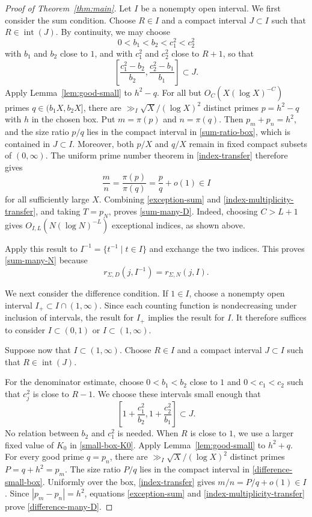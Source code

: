\documentclass[12pt,reqno]{amsart}
\numberwithin{equation}{section}
\theoremstyle{plain}
\theoremstyle{remark}
\begin{document}
\begin{proof}[Proof of Theorem~\ref{thm:main}]
Let $I$ be a nonempty open interval.
We first consider the sum condition.
Choose $R\in I$ and a compact interval $J\subset I$ such that
$R\in\operatorname{int}(J)$.
By continuity, we may choose
\begin{equation*}\label{sum-box-constants}
 0<b_1<b_2<c_1^2<c_2^2
\end{equation*}
with $b_1$ and $b_2$ close to $1$, and with $c_1^2$ and $c_2^2$
close to $R+1$, so that
\begin{equation}\label{sum-ratio-box}
 \left[
  \frac{c_1^2-b_2}{b_2},
  \frac{c_2^2-b_1}{b_1}
 \right]\subset J.
\end{equation}
Apply Lemma~\ref{lem:good-small} to $h^2-q$.
For all but $O_C(X(\log X)^{-C})$ primes $q\in(b_1X,b_2X]$,
there are $\gg_I\sqrt X/(\log X)^2$ distinct primes $p=h^2-q$
with $h$ in the chosen box.
Put $m=\pi(p)$ and $n=\pi(q)$.
Then $p_m+p_n=h^2$, and the size ratio $p/q$ lies in the compact
interval in \eqref{sum-ratio-box}, which is contained in
$J\subset I$.
Moreover, both $p/X$ and $q/X$ remain in fixed compact subsets of
$(0,\infty)$.
The uniform prime number theorem in \eqref{index-transfer} therefore
gives
\[
 \frac mn=\frac{\pi(p)}{\pi(q)}=\frac pq+o(1)\in I
\]
for all sufficiently large $X$.
Combining \eqref{exception-sum} and
\eqref{index-multiplicity-transfer}, and taking $T=p_N$, proves
\eqref{sum-many-D}.
Indeed, choosing $C>L+1$ gives
$O_{I,L}(N(\log N)^{-L})$ exceptional indices, as shown above.

Apply this result to $I^{-1}=\{t^{-1}\mid t\in I\}$ and exchange the
two indices.
This proves \eqref{sum-many-N} because
\[
 r_{\Sigma,D}(j,I^{-1})=r_{\Sigma,N}(j,I).
\]

We next consider the difference condition.
If $1\in I$, choose a nonempty open interval
$I_+\subset I\cap(1,\infty)$.
Since each counting function is nondecreasing under inclusion
of intervals, the result for $I_+$ implies the result for $I$.
It therefore suffices to consider
$I\subset(0,1)$ or $I\subset(1,\infty)$.

Suppose now that $I\subset(1,\infty)$.
Choose $R\in I$ and a compact interval $J\subset I$ such that
$R\in\operatorname{int}(J)$.

For the denominator estimate, choose $0<b_1<b_2$ close to $1$ and
$0<c_1<c_2$ such that $c_j^2$ is close to $R-1$.
We choose these intervals small enough that
\begin{equation}\label{difference-small-box}
 \left[
  1+\frac{c_1^2}{b_2},
  1+\frac{c_2^2}{b_1}
 \right]\subset J.
\end{equation}
No relation between $b_2$ and $c_1^2$ is needed.
When $R$ is close to $1$, we use a larger fixed value of $K_0$ in
\eqref{small-box-K0}.
Apply Lemma~\ref{lem:good-small} to $h^2+q$.
For every good prime $q=p_n$, there are
$\gg_I\sqrt X/(\log X)^2$ distinct primes $P=q+h^2=p_m$.
The size ratio $P/q$ lies in the compact interval in
\eqref{difference-small-box}.
Uniformly over the box, \eqref{index-transfer} gives
$m/n=P/q+o(1)\in I$.
Since $|p_m-p_n|=h^2$, equations \eqref{exception-sum} and
\eqref{index-multiplicity-transfer} prove
\eqref{difference-many-D}.


\end{proof}
\end{document}
